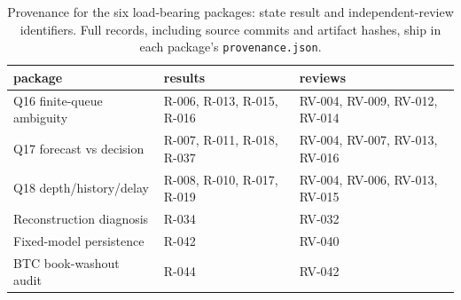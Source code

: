 \begin{table}[h]\centering
\caption{Provenance for the six load-bearing packages: state result and independent-review
identifiers. Full records, including source commits and artifact hashes, ship in each package's
\texttt{provenance.json}.}
\label{tab:prov}
\begin{tabular}{lll}
\toprule
package & results & reviews \\
\midrule
Q16 finite-queue ambiguity & R-006, R-013, R-015, R-016 & RV-004, RV-009, RV-012, RV-014 \\
Q17 forecast vs decision & R-007, R-011, R-018, R-037 & RV-004, RV-007, RV-013, RV-016 \\
Q18 depth/history/delay & R-008, R-010, R-017, R-019 & RV-004, RV-006, RV-013, RV-015 \\
Reconstruction diagnosis & R-034 & RV-032 \\
Fixed-model persistence & R-042 & RV-040 \\
BTC book-washout audit & R-044 & RV-042 \\
\bottomrule
\end{tabular}\end{table}
